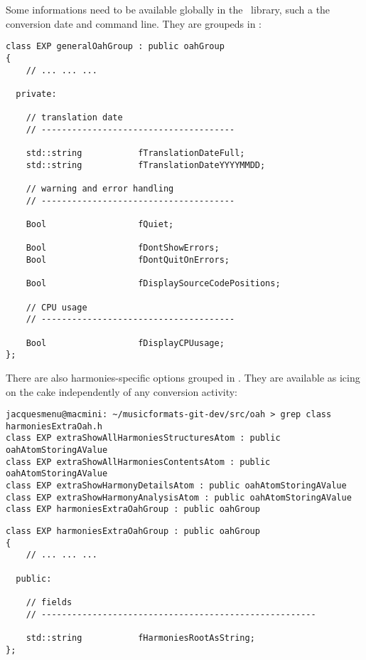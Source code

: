 Some informations need to be available globally in the \mf\ library, such a the conversion date and command line. They are groupeds in :
\begin{lstlisting}[language=CPlusPlus]
class EXP generalOahGroup : public oahGroup
{
	// ... ... ...

  private:

    // translation date
    // --------------------------------------

    std::string           fTranslationDateFull;
    std::string           fTranslationDateYYYYMMDD;

    // warning and error handling
    // --------------------------------------

    Bool                  fQuiet;

    Bool                  fDontShowErrors;
    Bool                  fDontQuitOnErrors;

    Bool                  fDisplaySourceCodePositions;

    // CPU usage
    // --------------------------------------

    Bool                  fDisplayCPUusage;
};
\end{lstlisting}

There are also harmonies-specific options grouped in . They are available as icing on the cake independently of any conversion activity:
\begin{lstlisting}[language=Terminal]
jacquesmenu@macmini: ~/musicformats-git-dev/src/oah > grep class   harmoniesExtraOah.h
class EXP extraShowAllHarmoniesStructuresAtom : public oahAtomStoringAValue
class EXP extraShowAllHarmoniesContentsAtom : public oahAtomStoringAValue
class EXP extraShowHarmonyDetailsAtom : public oahAtomStoringAValue
class EXP extraShowHarmonyAnalysisAtom : public oahAtomStoringAValue
class EXP harmoniesExtraOahGroup : public oahGroup
\end{lstlisting}

\begin{lstlisting}[language=CPlusPlus]
class EXP harmoniesExtraOahGroup : public oahGroup
{
 	// ... ... ...

  public:

    // fields
    // ------------------------------------------------------

    std::string           fHarmoniesRootAsString;
};
\end{lstlisting}


